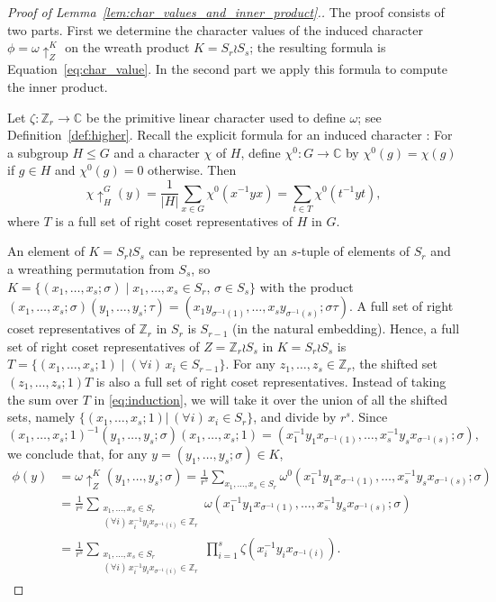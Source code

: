 \documentclass[10pt]{article}
\theoremstyle{definition}
\def\ZZ{{\mathbb Z}}
\begin{document}
\begin{proof}[Proof of  Lemma~\ref{lem:char_values_and_inner_product}.]
    The proof consists of two parts. 
    First we determine the character values of the induced character $\phi = \omega\uparrow_Z^K$ on the wreath product $K=S_r\wr S_{s}$; the resulting formula is Equation~\eqref{eq:char_value}. In the second part we 
    apply this formula to compute the inner product.
		
    Let $\zeta: \ZZ_r \to \mathbb{C}$ be the primitive linear character used to define $\omega$; see Definition~\ref{def:higher}. 
    Recall the explicit formula for an induced character \cite[(5.1)]{Isaacs}: 
    For a subgroup $H\leq G$ and a character $\chi$ of $H$, define $\chi^0 : G \to \mathbb{C}$ by $\chi^0(g) = \chi(g)$ if $g\in H$ and $\chi^0(g) = 0$ otherwise. Then
    \begin{equation}\label{eq:induction}
        \chi\uparrow_H^G(y)
        = \frac{1}{|H|} \sum_{x\in G} \chi^0(x^{-1}yx)
        = \sum_{t\in T} \chi^0(t^{-1}yt),
    \end{equation}
    where $T$ is a full set of right coset representatives of $H$ in $G$.
		
    An element of $K=S_r\wr S_s$ can be represented by an $s$-tuple of elements of $S_r$ and a wreathing permutation from $S_s$, so
    $K=\{(x_1,\ldots,x_s;\sigma) \mid x_1,\ldots,x_s \in S_{r},\,\sigma\in S_s\}$
    with the product
    $(x_1,\ldots,x_s;\sigma)(y_1,\ldots,y_s;\tau) = (x_1y_{\sigma^{-1}(1)},\ldots,x_sy_{\sigma^{-1}(s)};\sigma\tau)$. 
    A full set of right coset representatives of $\ZZ_r$ in $S_r$ is $S_{r-1}$ (in the natural embedding).
    Hence, a full set of right coset representatives of 
    $Z = \ZZ_r \wr S_s$ in $K= S_r \wr S_s$ is 
    $T = \{(x_1,\ldots,x_s;1)\mid (\forall i)\, x_i \in S_{r-1}\}$. For any $z_1,\ldots,z_s\in \ZZ_r$, the shifted set $(z_1,\ldots,z_s;1)T$ is also a full set of right coset representatives. 
    Instead of taking the sum over $T$ in \eqref{eq:induction}, we will take it over the union of all the shifted sets, namely $\{(x_1,\ldots,x_s;1) \vert\, (\forall i)\, x_i \in S_r\}$, and divide by $r^s$. 
    Since
    \[
        (x_1,\ldots,x_s;1)^{-1} (y_1,\ldots,y_s;\sigma) (x_1,\ldots,x_s;1)
        = (x_1^{-1}y_1x_{\sigma^{-1}(1)},\ldots,x_s^{-1}y_sx_{\sigma^{-1}(s)};\sigma),
    \]
    we conclude that, 
    for any $y = (y_1,\ldots,y_s;\sigma) \in K$,
    \begin{align*}
        \phi(y) 
        &= \omega\uparrow_Z^K(y_1,\ldots,y_s;\sigma)
        = \frac{1}{r^s} \sum_{x_1,\ldots,x_s \in S_r} \omega^0(x_1^{-1}y_1x_{\sigma^{-1}(1)},\ldots,x_s^{-1}y_sx_{\sigma^{-1}(s)};\sigma) \\ 
        &= \frac{1}{r^s} \sum_{\substack{x_1,\ldots,x_s \in S_r \\ (\forall i)\, x_i^{-1}y_ix_{\sigma^{-1}(i)} \in \ZZ_r}} \omega(x_1^{-1}y_1x_{\sigma^{-1}(1)},\ldots,x_s^{-1}y_sx_{\sigma^{-1}(s)};\sigma) \\
        &= \frac{1}{r^s} \sum_{\substack{x_1,\ldots,x_s \in S_r \\ (\forall i)\, x_i^{-1}y_ix_{\sigma^{-1}(i)} \in \ZZ_r}} \prod_{i=1}^{s} \zeta(x_i^{-1}y_ix_{\sigma^{-1}(i)}).
    \end{align*}


\end{proof}
\end{document}
